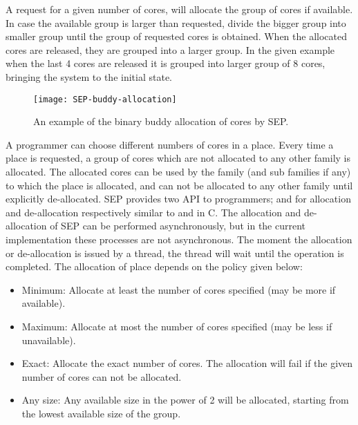 \documentclass{article}
\begin{document}
A request for a given number of cores, will allocate the group of cores if
available. In case the available group is larger than requested, divide the
bigger group into smaller group until the group of requested cores is obtained.
When the allocated cores are released, they are grouped into a larger group. In
the given example when the last 4 cores are released it is grouped into larger
group of 8 cores, bringing the system to the initial state.

\begin{figure}

\begin{centering}

\texttt{[image: SEP-buddy-allocation]}

\caption{\label{fig:sep_buddy_allocation}An example of the binary buddy
allocation of cores by SEP.}

\end{centering}

\end{figure}

A programmer can choose different numbers of cores in a place. Every time a
place is requested, a group of cores which are not allocated to any other
family is allocated. The allocated cores can be used by the family (and sub
families if any) to which the place is allocated, and can not be allocated to
any other family until explicitly de-allocated. SEP provides two API to
programmers;  and  for allocation and de-allocation
respectively similar to  and  in C. The allocation and
de-allocation of SEP can be performed asynchronously, but in the current
implementation these processes are not asynchronous. The moment the allocation
or de-allocation is issued by a thread, the thread will wait until the
operation is completed. The allocation of place depends on the policy given
below:

\begin{itemize}

\item Minimum: Allocate at least the number of cores specified (may be more if
    available).

\item Maximum: Allocate at most the number of cores specified (may be less if
    unavailable).

\item Exact: Allocate the exact number of cores. The allocation will fail if
    the given number of cores can not be allocated.

\item Any size: Any available size in the power of 2 will be allocated,
    starting from the lowest available size of the group.

\end{itemize}
\end{document}
